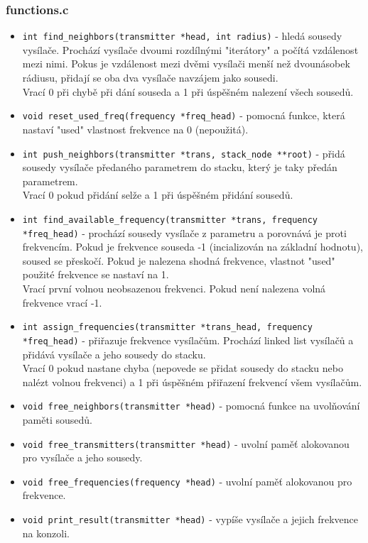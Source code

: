 \documentclass[12pt]{article}
\begin{document}
\subsubsection{functions.c}
\begin{itemize}
	\item \texttt{int find\_neighbors(transmitter *head, int radius)} - 
		hledá sousedy vysílače. Prochází vysílače dvoumi rozdílnými
		"iterátory" a počítá vzdálenost mezi nimi. Pokus je vzdálenost
		mezi dvěmi vysílači menší než dvounásobek rádiusu, přidají se
		oba dva vysílače navzájem jako sousedi.\\

		Vrací 0 při chybě při dání souseda a 1 při úspěšném nalezení
		všech sousedů.
	\item \texttt{void reset\_used\_freq(frequency *freq\_head)} - pomocná
		funkce, která nastaví "used" vlastnost frekvence na 0
		(nepoužitá).
	\item \texttt{int push\_neighbors(transmitter *trans,
		stack\_node **root)} - přidá sousedy vysílače předaného
		parametrem do stacku, který je taky předán parametrem.\\

		Vrací 0 pokud přidání selže a 1 při úspěšném přidání sousedů.
	\item \texttt{int find\_available\_frequency(transmitter *trans,
		frequency *freq\_head)} - prochází sousedy vysílače z 
		parametru a porovnává je proti frekvencím. Pokud je frekvence 
		souseda -1 (incializován na základní hodnotu), soused se 
		přeskočí. Pokud je nalezena shodná frekvence, vlastnot "used"
		použité frekvence se nastaví na 1.\\

		Vrací první volnou neobsazenou frekvenci. Pokud není nalezena 
		volná frekvence vrací -1.
	\item \texttt{int assign\_frequencies(transmitter *trans\_head,
		frequency *freq\_head)} - přiřazuje frekvence vysílačům. 
		Prochází linked list vysílačů a přidává vysílače a jeho sousedy
		do stacku.\\

		Vrací 0 pokud nastane chyba (nepovede se přidat sousedy do
		stacku nebo nalézt volnou frekvenci) a 1 při úspěšném 
		přiřazení frekvencí všem vysílačům.
	\item \texttt{void free\_neighbors(transmitter *head)} - pomocná funkce
		na uvolňování paměti sousedů.
	\item \texttt{void free\_transmitters(transmitter *head)} - uvolní paměť
		alokovanou pro vysílače a jeho sousedy.
	\item \texttt{void free\_frequencies(frequency *head)} - uvolní paměť
		alokovanou pro frekvence.
	\item \texttt{void print\_result(transmitter *head)} - vypíše vysílače
		a jejich frekvence na konzoli.
\end{itemize}
\end{document}

